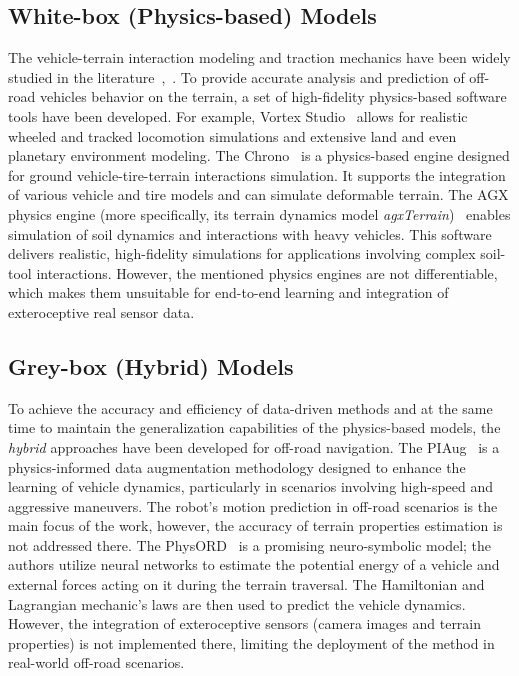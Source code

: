 \subsection{White-box (Physics-based) Models}\label{subsec:white-box-models}

The vehicle-terrain interaction modeling and traction mechanics have been widely studied in the literature~\cite{yong2012vehicle},~\cite{blau2008friction}.
To provide accurate analysis and prediction of off-road vehicles behavior on the terrain,
a set of high-fidelity physics-based software tools have been developed.
For example, Vortex Studio~\cite{vortexstudio2025} allows for realistic wheeled and tracked locomotion simulations
and extensive land and even planetary environment modeling.
The Chrono~\cite{serban2019integrated} is a physics-based engine designed for ground vehicle-tire-terrain interactions simulation.
It supports the integration of various vehicle and tire models and can simulate deformable terrain.
The AGX physics engine
(more specifically, its terrain dynamics model \textit{agxTerrain})~\cite{Berglund2019agxTerrain}
enables simulation of soil dynamics and interactions with heavy vehicles.
This software delivers realistic, high-fidelity simulations for applications
involving complex soil-tool interactions.
However, the mentioned physics engines are not differentiable,
which makes them unsuitable for end-to-end learning and integration of exteroceptive real sensor data.


\subsection{Grey-box (Hybrid) Models}\label{subsec:grey-box-models}

To achieve the accuracy and efficiency of data-driven methods and at the same time to
maintain the generalization capabilities of the physics-based models,
the \textit{hybrid} approaches have been developed for off-road navigation.
The PIAug~\cite{maheshwari2023piaug} is a physics-informed data augmentation methodology designed to enhance the learning
of vehicle dynamics, particularly in scenarios involving high-speed and aggressive maneuvers.
The robot's motion prediction in off-road scenarios is the main focus of the work, however,
the accuracy of terrain properties estimation is not addressed there.
The PhysORD~\cite{zhao2024physord} is a promising neuro-symbolic model;
the authors utilize neural networks to estimate the potential energy of a vehicle and
external forces acting on it during the terrain traversal.
The Hamiltonian and Lagrangian mechanic's laws are then used to predict the vehicle dynamics.
However, the integration of exteroceptive sensors (camera images and terrain properties)
is not implemented there, limiting the deployment of the method in real-world off-road scenarios.

